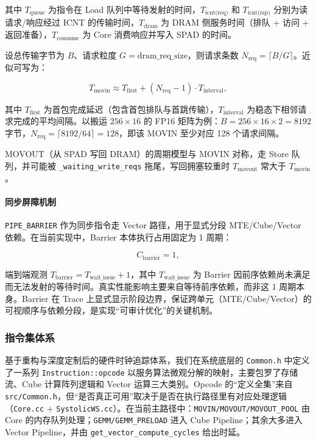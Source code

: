 \documentclass{CjC}
\begin{document}
    其中 $T_{\text{queue}}$ 为指令在 Load 队列中等待发射的时间，$T_{\text{icnt(req)}}$
    和 $T_{\text{icnt(rsp)}}$ 分别为读请求/响应经过 ICNT 的传输时间，$T_{\text{dram}}$
    为 DRAM 侧服务时间（排队 + 访问 + 返回准备），$T_{\text{consume}}$ 为 Core
    消费响应并写入 SPAD 的时间。

    设总传输字节为 $B$、请求粒度 $G = \text{dram\_req\_size}$，则请求条数 $N_{\text{req}}
    = \lceil B / G \rceil$。近似可写为：

    \begin{equation}
        T_{\text{movin}}\approx T_{\text{first}}+ (N_{\text{req}}- 1) \cdot T_{\text{interval}}
        ,
    \end{equation}

    其中 $T_{\text{first}}$ 为首包完成延迟（包含首包排队与首跳传输），$T_{\text{interval}}$
    为稳态下相邻请求完成的平均间隔。以搬运 $256 \times 16$ 的 FP16 矩阵为例：$B =
    256 \times 16 \times 2 = 8192$
    字节，$N_{\text{req}}= \lceil 8192 / 64 \rceil = 128$，即该 MOVIN 至少对应
    128 个请求间隔。

    MOVOUT（从 SPAD 写回 DRAM）的周期模型与 MOVIN 对称，走 Store 队列，并可能被 \texttt{\_waiting\_write\_reqs}
    拖尾，写回拥塞较重时 $T_{\text{movout}}$ 常大于 $T_{\text{movin}}$。

    \paragraph{同步屏障机制}
    \texttt{PIPE\_BARRIER} 作为同步指令走 Vector 路径，用于显式分段 MTE/Cube/Vector
    依赖。在当前实现中，Barrier 本体执行占用固定为 1 周期：

    \begin{equation}
        C_{\text{barrier}}= 1,
    \end{equation}

    端到端观测 $T_{\text{barrier}}= T_{\text{wait\_issue}}+ 1$，其中 $T_{\text{wait\_issue}}$
    为 Barrier 因前序依赖尚未满足而无法发射的等待时间。真实性能影响主要来自等待前序依赖，而非这
    1 周期本身。Barrier 在 Trace 上显式显示阶段边界，保证跨单元（MTE/Cube/Vector）的可视顺序与依赖分段，是实现“可审计优化”的关键机制。

    \subsubsection{指令集体系}
    基于重构与深度定制后的硬件时钟追踪体系，我们在系统底层的 \texttt{Common.h} 中定义了一系列
    \texttt{Instruction::opcode}
    以服务算法微观分解的映射，主要包罗了存储流、Cube 计算阵列逻辑和 Vector
    运算三大类别。Opcode 的“定义全集”来自 \texttt{src/Common.h}，但“是否真正可用”取决于是否在执行路径里有对应处理逻辑（\texttt{Core.cc}
    + \texttt{SystolicWS.cc}）。在当前主路径中：\texttt{MOVIN/MOVOUT/MOVOUT\_POOL}
    由 Core 的内存队列处理；\texttt{GEMM/GEMM\_PRELOAD} 进入 Cube
    Pipeline；其余大多进入 Vector Pipeline，并由 \texttt{get\_vector\_compute\_cycles}
    给出时延。
\end{document}
